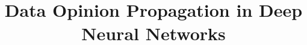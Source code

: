 \documentclass[conference]{IEEEtran}
\begin{document}
\title{Data Opinion Propagation in Deep Neural Networks\\
}


\maketitle
\thispagestyle{plain}
\pagestyle{plain}







% 
% 
% 









\end{document}
